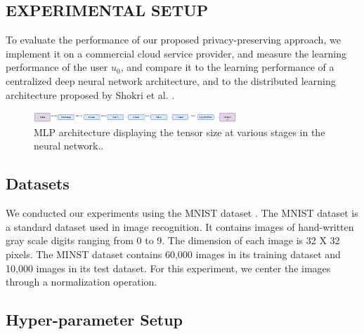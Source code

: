 \documentclass[letterpaper]{article}
\begin{document}
\begin{flushleft}
{\section{EXPERIMENTAL SETUP}

To evaluate the performance of our proposed privacy-preserving approach, we implement it on a commercial cloud service provider, and measure the
learning performance of the user $u_0$, and compare it to the learning performance of a centralized deep neural network
architecture, and to the distributed learning architecture proposed by Shokri et al. \cite{shokri2015privacy}.

\begin{figure}[H]
  \centering
    \includegraphics[width=3in]{MLPArchitecture.png}
    \caption[Tensor sizes in a MLP architecture.]{\label{fig:MLPArch} MLP architecture displaying the tensor size at various stages in the neural network..}
  \end{figure}


\subsection{Datasets}
We conducted our experiments using the MNIST dataset \cite{deng2012mnist}. The MNIST dataset is a standard dataset used in image
recognition. It contains images of hand-written gray scale digits ranging from 0 to 9. The dimension of each image is 32 X 32 pixels.
The MINST dataset contains 60,000 images in its training dataset and 10,000 images in its test dataset.
For this experiment, we center the images through a normalization operation.  

\subsection{Hyper-parameter Setup}


}
\end{flushleft}
\end{document}
